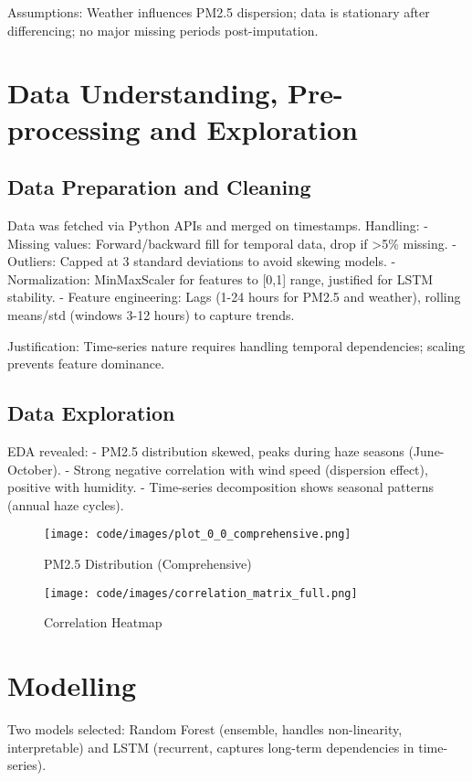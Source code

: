 \documentclass{article}
\begin{document}
Assumptions: Weather influences PM2.5 dispersion; data is stationary after differencing; no major missing periods post-imputation.

\section{Data Understanding, Pre-processing and Exploration}

\subsection{Data Preparation and Cleaning}
Data was fetched via Python APIs and merged on timestamps. Handling:
- Missing values: Forward/backward fill for temporal data, drop if >5\% missing.
- Outliers: Capped at 3 standard deviations to avoid skewing models.
- Normalization: MinMaxScaler for features to [0,1] range, justified for LSTM stability.
- Feature engineering: Lags (1-24 hours for PM2.5 and weather), rolling means/std (windows 3-12 hours) to capture trends.

Justification: Time-series nature requires handling temporal dependencies; scaling prevents feature dominance.

\subsection{Data Exploration}
EDA revealed:
- PM2.5 distribution skewed, peaks during haze seasons (June-October).
- Strong negative correlation with wind speed (dispersion effect), positive with humidity.
- Time-series decomposition shows seasonal patterns (annual haze cycles).

\begin{figure}[h]
\centering
\texttt{[image: code/images/plot\_0\_0\_comprehensive.png]}
\caption{PM2.5 Distribution (Comprehensive)}
\end{figure}

\begin{figure}[h]
\centering
\texttt{[image: code/images/correlation\_matrix\_full.png]}
\caption{Correlation Heatmap}
\end{figure}

\section{Modelling}

Two models selected: Random Forest (ensemble, handles non-linearity, interpretable) and LSTM (recurrent, captures long-term dependencies in time-series).
\end{document}
